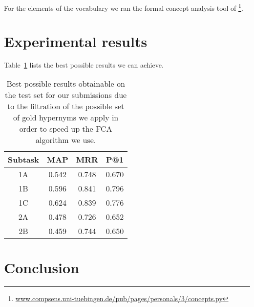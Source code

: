 \documentclass[11pt,a4paper]{article}
\begin{document}
For the elements of the vocabulary we ran the formal concept analysis tool of \citet{2010378} \footnote{\url{www.compsens.uni-tuebingen.de/pub/pages/personals/3/concepts.py}}.

\section{Experimental results}

Table~\ref{table:upper} lists the best possible results we can achieve.

\begin{table}
	\centering
	\begin{tabular}{c|ccc}
		Subtask & MAP & MRR & P@1 \\ \hline 
		1A & 0.542 & 0.748 & 0.670 \\
		1B & 0.596 & 0.841 & 0.796 \\
		1C & 0.624 & 0.839 & 0.776 \\
		2A & 0.478 & 0.726 & 0.652 \\
		2B & 0.459 & 0.744 & 0.650 \\
	\end{tabular}
	\label{table:upper}
	\caption{Best possible results obtainable on the test set for our 
submissions due to the filtration of the possible set of gold hypernyms 
we apply in order to speed up the FCA algorithm we use.}
\end{table}

\section{Conclusion}



\end{document}
